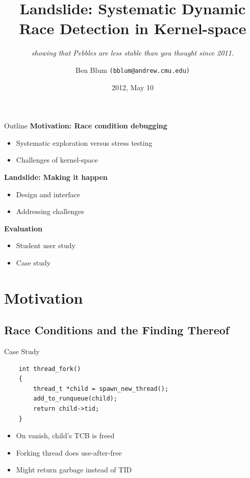 \documentclass[xcolor=dvipsnames]{beamer}
\title[Landslide]{{\bf Landslide: Systematic Dynamic Race Detection in Kernel-space}}
\subtitle[]{ {\em showing that Pebbles are less stable than you thought since 2011.}}
\author[Ben Blum]{Ben Blum \texttt{(bblum@andrew.cmu.edu)}}
\institute[CMU]{Carnegie Mellon University}
\date[]{2012, May 10}
\begin{document}
\normalem
\begin{frame}
	\titlepage
\end{frame}


\newcommand\linegap{\vspace{0.2in}}
\newcommand\breakslide[1]{\begin{frame}{} \begin{center} #1 \end{center} \end{frame}}
\newcommand\related[1]{\textsuperscript{\em #1}}

\begin{frame}{Outline}
	\textbf{Motivation: Race condition debugging}
	\begin{itemize}
		\item Systematic exploration versus stress testing
		\item Challenges of kernel-space
	\end{itemize}
	{\bf Landslide: Making it happen}
	\begin{itemize}
		\item Design and interface 
		\item Addressing challenges
	\end{itemize}
	{\bf Evaluation}
	\begin{itemize}
		\item Student user study
		\item Case study
	\end{itemize}
\end{frame}

\section{Motivation}

\subsection{Race Conditions and the Finding Thereof}

\begin{frame}[fragile]{Case Study}
	\begin{center}
	\begin{verbatim}
	int thread_fork()
	{
	    thread_t *child = spawn_new_thread();
	    add_to_runqueue(child);
	    return child->tid;
	}
	\end{verbatim}
	\end{center}

	\begin{itemize}
		\item On vanish, child's TCB is freed
		\item Forking thread does use-after-free
		\item Might return garbage instead of TID
	\end{itemize}
\end{frame}
\end{document}
